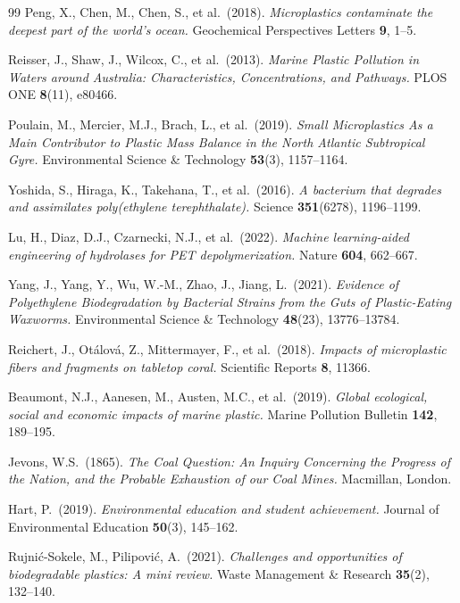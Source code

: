 ﻿\documentclass[12pt,a4paper]{article}
\theoremstyle{definition}
\theoremstyle{remark}
\begin{document}
\begin{thebibliography}{99}
Peng, X., Chen, M., Chen, S., et al.\ (2018).
\textit{Microplastics contaminate the deepest part of the world's ocean.}
Geochemical Perspectives Letters \textbf{9}, 1--5.

Reisser, J., Shaw, J., Wilcox, C., et al.\ (2013).
\textit{Marine Plastic Pollution in Waters around Australia: Characteristics,
Concentrations, and Pathways.}
PLOS ONE \textbf{8}(11), e80466.

Poulain, M., Mercier, M.J., Brach, L., et al.\ (2019).
\textit{Small Microplastics As a Main Contributor to Plastic Mass Balance in the North Atlantic Subtropical Gyre.}
Environmental Science \& Technology \textbf{53}(3), 1157--1164.

Yoshida, S., Hiraga, K., Takehana, T., et al.\ (2016).
\textit{A bacterium that degrades and assimilates poly(ethylene terephthalate).}
Science \textbf{351}(6278), 1196--1199.

Lu, H., Diaz, D.J., Czarnecki, N.J., et al.\ (2022).
\textit{Machine learning-aided engineering of hydrolases for PET depolymerization.}
Nature \textbf{604}, 662--667.

Yang, J., Yang, Y., Wu, W.-M., Zhao, J., Jiang, L.\ (2021).
\textit{Evidence of Polyethylene Biodegradation by Bacterial Strains from the Guts of Plastic-Eating Waxworms.}
Environmental Science \& Technology \textbf{48}(23), 13776--13784.

Reichert, J., Ot\'alov\'a, Z., Mittermayer, F., et al.\ (2018).
\textit{Impacts of microplastic fibers and fragments on tabletop coral.}
Scientific Reports \textbf{8}, 11366.

Beaumont, N.J., Aanesen, M., Austen, M.C., et al.\ (2019).
\textit{Global ecological, social and economic impacts of marine plastic.}
Marine Pollution Bulletin \textbf{142}, 189--195.

Jevons, W.S.\ (1865).
\textit{The Coal Question: An Inquiry Concerning the Progress of the Nation, and the Probable Exhaustion of our Coal Mines.}
Macmillan, London.

Hart, P.\ (2019).
\textit{Environmental education and student achievement.}
Journal of Environmental Education \textbf{50}(3), 145--162.

Rujni{\'c}-Sokele, M., Pilipovi{\'c}, A.\ (2021).
\textit{Challenges and opportunities of biodegradable plastics: A mini review.}
Waste Management \& Research \textbf{35}(2), 132--140.

\end{thebibliography}
\end{document}
